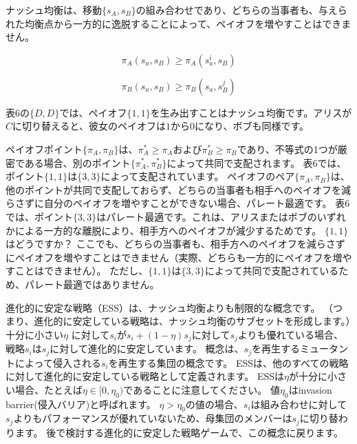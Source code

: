 ナッシュ均衡は、移動$\{ s_A, s_B \}$の組み合わせであり、どちらの当事者も、与えられた均衡点から一方的に逸脱することによって、ペイオフを増やすことはできません。

\begin{equation}
\label{117}
\pi_A (s_a, s_B ) 
\ge
\pi_A (s^i_a, s_B ) 
\end{equation}

\begin{equation}
\label{118}
\pi_B (s_a, s_B ) 
\ge
\pi_B (s_a, s^j_B ) 
\end{equation}

表6の$\{D,D \}$では、ペイオフ$\{1,1 \}$を生み出すことはナッシュ均衡です。アリスが$C$に切り替えると、彼女のペイオフは$1$から$0$になり、ボブも同様です。

ペイオフポイント$\{ \pi_A, \pi_B \}$は、$\pi_A^* \ge \pi_A$および$\pi_B^* \ge \pi_B$であり、不等式の1つが厳密である場合、別のポイント$ \{ \pi_A^*, \pi_B^* \}$によって共同で支配されます。
表6では、ポイント$\{ 1,1 \}$は$\{ 3,3 \}$によって支配されています。
ペイオフのペア$ \{ \pi_A, \pi_B \}$は、他のポイントが共同で支配しておらず、どちらの当事者も相手へのペイオフを減らさずに自分のペイオフを増やすことができない場合、パレート最適です。
表6では、ポイント$\{ 3,3 \}$はパレート最適です。これは、アリスまたはボブのいずれかによる一方的な離脱により、相手方へのペイオフが減少するためです。 $\{ 1,1 \}$はどうですか？ ここでも、どちらの当事者も、相手方へのペイオフを減らさずにペイオフを増やすことはできません（実際、どちらも一方的にペイオフを増やすことはできません）。 ただし、$ \{ 1,1 \}$は$ \{ 3,3 \}$によって共同で支配されているため、パレート最適ではありません。

進化的に安定な戦略（ESS）は、ナッシュ均衡よりも制限的な概念です。 （つまり、進化的に安定している戦略は、ナッシュ均衡のサブセットを形成します。）十分に小さい$\eta$ に対して$s_i$が$s_i + (1 − \eta ) s_j$に対して$s_j$よりも優れている場合、戦略$s_i$は$s_j$に対して進化的に安定しています。 概念は、$s_j$を再生するミュータントによって侵入される$s_i$を再生する集団の概念です。 ESSは、他のすべての戦略に対して進化的に安定している戦略として定義されます。 ESSは$\eta$が十分に小さい場合、たとえば$\eta \in [0, \eta_0)$であることに注意してください。 値$\eta_0$はinvasion barrier(侵入バリア)と呼ばれます。 $\eta > \eta_0$の値の場合、$s_i$は組み合わせに対して$s_j$よりもパフォーマンスが優れていないため、母集団のメンバーは$s_j$に切り替わります。 後で検討する進化的に安定した戦略ゲームで、この概念に戻ります。
